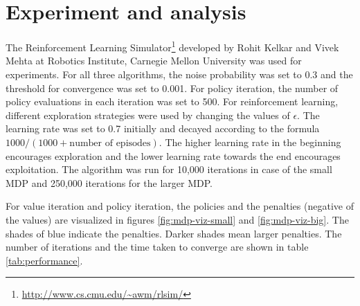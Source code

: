 \documentclass[letterpaper]{article}
\begin{document}
	\section{Experiment and analysis}
	The Reinforcement Learning Simulator\footnote{\url{http://www.cs.cmu.edu/~awm/rlsim/}} developed by Rohit Kelkar and Vivek Mehta at Robotics Institute, Carnegie Mellon University was used for experiments. For all three algorithms, the noise probability was set to 0.3 and the threshold for convergence was set to 0.001. For policy iteration, the number of policy evaluations in each iteration was set to 500. For reinforcement learning, different exploration strategies were used by changing the values of $\epsilon$. The learning rate was set to 0.7 initially and decayed according to the formula $1000/(1000 + \text{number of episodes})$. The higher learning rate in the beginning encourages exploration and the lower learning rate towards the end encourages exploitation. The algorithm was run for 10,000 iterations in case of the small MDP and 250,000 iterations for the larger MDP.
	
	For value iteration and policy iteration, the policies and the penalties (negative of the values) are visualized in figures \ref{fig:mdp-viz-small} and \ref{fig:mdp-viz-big}. The shades of blue indicate the penalties. Darker shades mean larger penalties. The number of iterations and the time taken to converge are shown in table \ref{tab:performance}.
	
\end{document}
